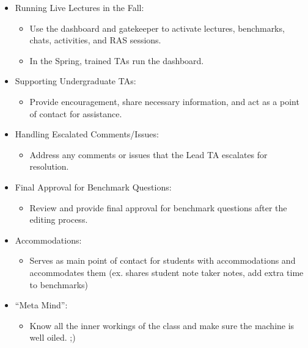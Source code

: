 \documentclass[
]{article}
\providecommand{\tightlist}{%
  \setlength{\itemsep}{0pt}\setlength{\parskip}{0pt}}
\begin{document}
\begin{itemize}
\tightlist
\item
  Running Live Lectures in the Fall:

  \begin{itemize}
  \tightlist
  \item
    Use the dashboard and gatekeeper to activate lectures, benchmarks, chats, activities, and RAS sessions.
  \item
    In the Spring, trained TAs run the dashboard.
  \end{itemize}
\item
  Supporting Undergraduate TAs:

  \begin{itemize}
  \tightlist
  \item
    Provide encouragement, share necessary information, and act as a point of contact for assistance.
  \end{itemize}
\item
  Handling Escalated Comments/Issues:

  \begin{itemize}
  \tightlist
  \item
    Address any comments or issues that the Lead TA escalates for resolution.
  \end{itemize}
\item
  Final Approval for Benchmark Questions:

  \begin{itemize}
  \tightlist
  \item
    Review and provide final approval for benchmark questions after the editing process.
  \end{itemize}
\item
  Accommodations:

  \begin{itemize}
  \tightlist
  \item
    Serves as main point of contact for students with accommodations and accommodates them (ex. shares student note taker notes, add extra time to benchmarks)
  \end{itemize}
\item
  ``Meta Mind'':

  \begin{itemize}
  \tightlist
  \item
    Know all the inner workings of the class and make sure the machine is well oiled. ;)
  \end{itemize}
\end{itemize}
\end{document}
